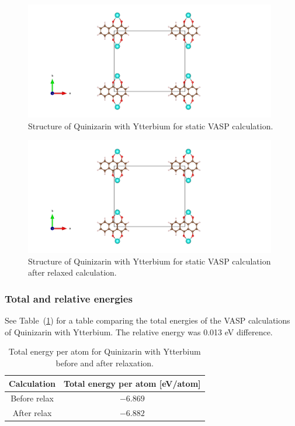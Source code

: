 \documentclass{article}
\begin{document}
      \begin{figure}[H]
        \centering
        \includegraphics[width = 11cm]{../fig/Yb_staticbefore_CONTCAR.png}
        \caption{Structure of Quinizarin with Ytterbium for static VASP calculation. }
        \label{fig:Yb_staticbefore_CONTCAR}
      \end{figure}

      \begin{figure}[H]
        \centering
        \includegraphics[width = 11cm]{../fig/Yb_staticafter_CONTCAR.png}
        \caption{Structure of Quinizarin with Ytterbium for static VASP calculation after relaxed calculation. }
        \label{fig:Yb_staticafter_CONTCAR}
      \end{figure}

    \subsubsection{Total and relative energies}

      See Table~(\ref{tab:TOTENYb}) for a table comparing the total energies of the VASP calculations of Quinizarin with Ytterbium. The relative energy was 0.013 eV difference.

      \begin{table}[H]
        \centering
        \caption{Total energy per atom for Quinizarin with Ytterbium before and after relaxation. }
        \label{tab:TOTENYb}
        \begin{tabular}{|c|c|}
            \hline
            Calculation & Total energy per atom [eV/atom]  \\
            \hline \hline
            Before relax & $-6.869$ \\
            After relax & $-6.882$ \\
            \hline
        \end{tabular} \\
        \hspace{0pt}\\
      \end{table}
\end{document}
